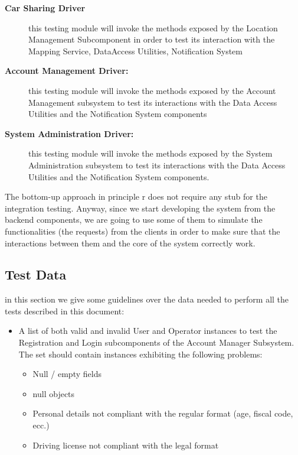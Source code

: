 \documentclass{article}
\begin{document}
\begin{flushleft}
\begin{description}
   
   \item[\textbf{Car Sharing Driver}] this testing module will invoke the methods exposed by the Location Management Subcomponent  in order to test its interaction with the Mapping Service, DataAccess Utilities, Notification System
   
  
  \item[\textbf{Account Management Driver:}] this testing module will invoke the methods exposed by the Account Management subsystem to test its interactions with the Data Access Utilities and the Notification System components
  \item[\textbf{System Administration Driver:}] this testing module will invoke the methods exposed by the System Administration subsystem to test its interactions with the Data Access Utilities and the Notification System components.
  
  
  
  
  
  \end{description}
  
  
  The bottom-up approach in principle r does not require any stub for the integration testing. Anyway, since we start developing the system from the backend components, we are going to use some of them to simulate the functionalities (the requests) from the clients in order to make sure that the interactions between them and the core of the system correctly work.
  
  
  
  
  \subsection{Test Data}
  in this section we give some guidelines over the data needed to perform all the tests described in this document:
  
  
  \begin{itemize}
  
  \item A list of both valid and invalid User and Operator instances to test the Registration and Login subcomponents of the Account Manager Subsystem. The set should contain instances exhibiting the following problems:
  
  \begin{itemize}
  
    \item Null / empty fields
    \item null objects
    \item Personal details not compliant with the regular format (age, fiscal code, ecc.)
  \item Driving license not compliant with the legal format
  \end{itemize}
  


\end{itemize}
\end{flushleft}
\end{document}
